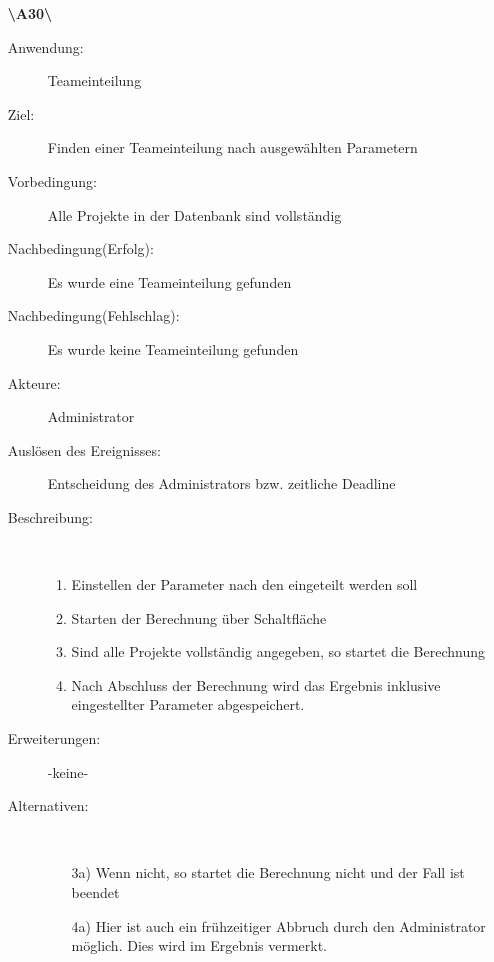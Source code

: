 \documentclass[parskip=full]{scrartcl}
\begin{document}
\begin{enumerate}
  \item[\textbf{\textbackslash A30\textbackslash}] \begin{description}
  \item[Anwendung:] Teameinteilung
  \item[Ziel:] Finden einer Teameinteilung nach ausgewählten Parametern
  	\item[Vorbedingung:] Alle Projekte in der Datenbank sind vollständig
  	\item[Nachbedingung(Erfolg):] Es wurde eine Teameinteilung gefunden
  	\item[Nachbedingung(Fehlschlag):] Es wurde keine Teameinteilung gefunden
  	\item[Akteure:] Administrator
  	\item[Auslösen des Ereignisses:] Entscheidung des Administrators bzw.
  	zeitliche Deadline
  	\item[Beschreibung:]~
  	\begin{enumerate}[1.]
  	  \item Einstellen der Parameter nach den eingeteilt werden soll
  	  \item Starten der Berechnung über Schaltfläche
  	  \item Sind alle Projekte vollständig angegeben, so startet die Berechnung
  	  \item Nach Abschluss der Berechnung wird das Ergebnis inklusive
  	  eingestellter Parameter abgespeichert.
  	\end{enumerate}
  	\item[Erweiterungen:] -keine-
  	\item[Alternativen:] ~
  	\begin{enumerate}
  	  \item[3a)] Wenn nicht, so startet die Berechnung nicht und der Fall ist
  	  beendet
  	  \item[4a)] Hier ist auch ein frühzeitiger Abbruch durch den Administrator
  	  möglich. Dies wird im Ergebnis vermerkt.
  	 \end{enumerate}  
  \end{description}
  \pagebreak
  

\end{enumerate}
\end{document}
